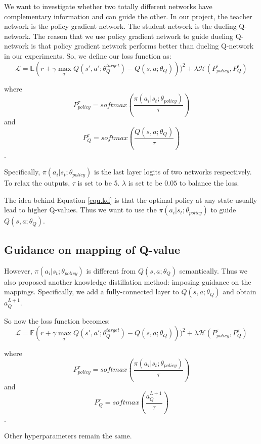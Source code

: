 %
We want to investigate whether two totally different networks have complementary information and can guide the other.
%
In our project, the teacher network is the policy gradient network. The student network is the dueling Q-network. The reason that we use policy gradient network to guide dueling Q-network is that policy gradient network performs better than dueling Q-network in our experiments.
%
So, we define our loss function as:
\begin{equation}
\label{equ.kd}
\mathcal{L} = \mathbb{E}(r+\gamma \max_{a'}Q(s',a';\theta^{target}_{Q})-Q(s,a;\theta_{Q})))^2  + \lambda\mathcal{H} ( P^{\tau}_{policy},P^{\tau}_{Q} )
\end{equation}

\noindent
where 
$$P^{\tau}_{policy} = softmax(\frac{\pi(a_i|s_t;\theta_{policy})}{\tau})$$
and  
$$P^{\tau}_{Q} = softmax( \frac{Q(s,a;\theta_{Q})} {\tau} )$$.

\noindent
Specifically, $\pi(a_i|s_t;\theta_{policy})$ is the last layer logits of two networks respectively. To relax the outputs, $\tau$ is set to be 5. $\lambda$ is set te be $0.05$ to balance the loss.

The idea behind Equation \ref{equ.kd} is that the optimal policy at any state usually lead to higher Q-values. Thus we want to use the $\pi(a_i|s_t;\theta_{policy})$ to guide $Q(s,a;\theta_{Q})$.

\subsection{Guidance on mapping of Q-value}
However,  $\pi(a_i|s_t;\theta_{policy})$ is different from $Q(s,a;\theta_{Q})$ semantically. Thus we also proposed another knowledge distillation method: imposing guidance on the mappings.
%
Specifically, we add a fully-connected layer to $Q(s,a;\theta_{Q})$ and obtain  $a^{L+1}_{Q}$.

So now the loss function becomes:
\begin{equation}
\label{equ.kd}
\mathcal{L} = \mathbb{E}(r+\gamma \max_{a'}Q(s',a';\theta^{target}_{Q})-Q(s,a;\theta_{Q})))^2  + \lambda\mathcal{H} ( P^{\tau}_{policy},P^{\tau}_{Q} )
\end{equation}

\noindent
where 
$$P^{\tau}_{policy} = softmax(\frac{\pi(a_i|s_t;\theta_{policy})}{\tau})$$
and  
$$P^{\tau}_{Q} = softmax( \frac{a^{L+1}_{Q}} {\tau} )$$.

Other hyperparameters remain the same.

